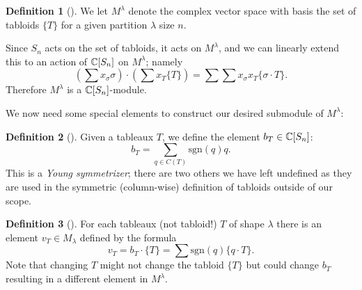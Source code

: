 \documentclass[12pt,twoside]{reedthesis}
\theoremstyle{plain}   %
\theoremstyle{definition}
\newtheorem{defn}{Definition}[section]
\theoremstyle{remark}
\numberwithin{equation}{section}
\def\sgn{\mathrm{sgn}}
\begin{document}
  \begin{defn}[{\cite[Pg. 86]{fulton}}]
    We let $M^\lambda$ denote the complex vector space with basis the set of tabloids $\{T\}$ for a given partition $\lambda$ size $n$.\par
    Since $S_n$ acts on the set of tabloids, it acts on $M^\lambda$, and we can linearly extend this to an action of $\mathbb{C}[S_n]$ on $M^\lambda$;
    namely
    \[ (\sum x_\sigma \sigma) \cdot (\sum x_T \{T\}) = \sum \sum x_\sigma x_T \{ \sigma \cdot T \}.\]
    Therefore $M^\lambda$ is a $\mathbb{C}[S_n]$-module. 
  \end{defn}
  We now need some special elements to construct our desired submodule of $M^\lambda$:
  \begin{defn}[{\cite[Pg. 86]{fulton}}]
    Given a tableaux $T$, we define the element $ b_T \in \mathbb{C}[S_n]$:
    \[b_T = \sum_{q \in C(T)} \sgn(q)q.\]
    This is a \emph{Young symmetrizer}; there are two others we have left undefined as they are used in the symmetric (column-wise)
    definition of tabloids outside of our scope.
  \end{defn}

  \begin{defn}[{\cite[Pg. 86]{fulton}}]
    For each tableaux (not tabloid!) $T$ of shape $\lambda$ there is an element $v_T \in M_\lambda$
    defined by the formula
    \[v_T = b_T \cdot \{T\} = \sum \sgn(q) \{q \cdot T\}.\]
    Note that changing $T$ might not change the tabloid $\{T\}$ but could change $b_T$ resulting in a different element in $M^\lambda$.
  \end{defn}
\end{document}
